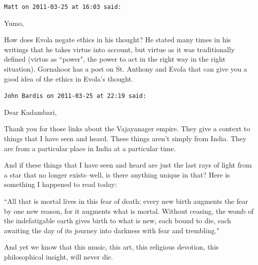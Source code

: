 \begin{footnotesize}
\begin{sffamily}
\hfill

\texttt{Matt on 2011-03-25 at 16:03 said: }

Yumo, 

How does Evola negate ethics in his thought? He stated many times in his writings that he takes virtue into account, but virtue as it was traditionally defined (virtus as ``power", the power to act in the right way in the right situation). Gornahoor has a post on St. Anthony and Evola that can give you a good idea of the ethics in Evola's thought.


\hfill

\texttt{John Bardis on 2011-03-25 at 22:19 said: }

Dear Kadambari,

Thank you for those links about the Vajayanager empire. They give a context to things that I have seen and heard. These things aren't simply from India. They are from a particular place in India at a particular time.

And if these things that I have seen and heard are just the last rays of light from a star that no longer exists–well, is there anything unique in that? Here is something I happened to read today:

``All that is mortal lives in this fear of death; every new birth augments the fear by one new reason, for it augments what is mortal. Without ceasing, the womb of the indefatigable earth gives birth to what is new, each bound to die, each awaiting the day of its journey into darkness with fear and trembling."

And yet we know that this music, this art, this religious devotion, this philosophical insight, will never die.

\hfill

\end{sffamily}
\end{footnotesize}

